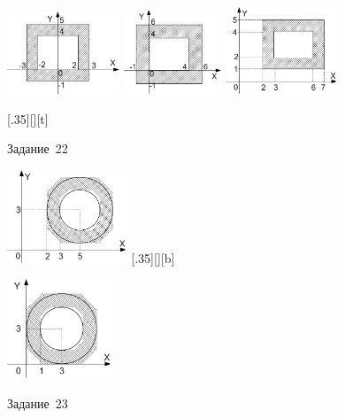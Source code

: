 \begin{figure}[h]%
\begin{floatrow}[3]
{\includegraphics[width=0.30\textwidth,keepaspectratio]{img/ris_3_82}}
{\includegraphics[width=0.26\textwidth,keepaspectratio]{img/ris_3_83}}
{\includegraphics[width=0.30\textwidth,keepaspectratio]{img/ris_3_84}}
\end{floatrow}
\end{figure}%

\begin{figure}[h]
\begin{floatrow}
[.35\textwidth][\FBheight][t]
{\caption{Задание~22}
\label{ch03:refDrawing84}}
{\includegraphics[width=0.32\textwidth,keepaspectratio]{img/ris_3_85}}%
%
[.35\textwidth][\FBheight][b]
{\caption{Задание~23}
\label{ch03:refDrawing85}}
{\includegraphics[width=0.28\textwidth]{img/ris_3_86}}
\end{floatrow}
\end{figure}

